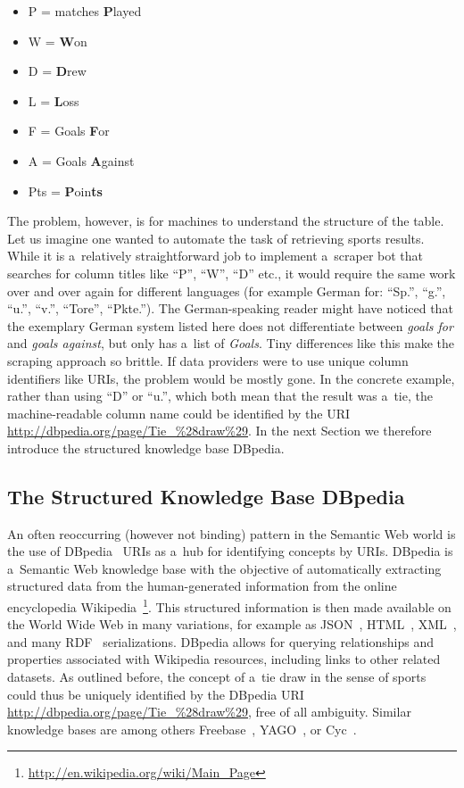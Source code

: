 \begin{itemize}
\item P = matches \textbf{P}layed
\item W = \textbf{W}on 
\item D = \textbf{D}rew
\item L = \textbf{L}oss
\item F = Goals \textbf{F}or
\item A = Goals \textbf{A}gainst
\item Pts = \textbf{P}oin\textbf{ts}
\end{itemize}

The problem, however, is for machines to understand the structure of the table.
Let us imagine one wanted to automate the task of retrieving sports results.
While it is a~relatively straightforward job to implement a~scraper bot that
searches for column titles like ``P'', ``W'', ``D'' etc.,
it would require the same work over and over again for different languages
(for example German for: ``Sp.'', ``g.'', ``u.'', ``v.'', ``Tore'', ``Pkte.'').
The German-speaking reader might have noticed that the exemplary German system listed here
does not differentiate between \emph{goals for} and \emph{goals against}, but only has a~list of \emph{Goals}.
Tiny differences like this make the scraping approach so brittle.
If data providers were to use unique column identifiers like URIs, the problem would be mostly gone.
In the concrete example, rather than using ``D'' or ``u.'', which both mean that the result was a~tie,
the machine-readable column name could be identified by the URI
\url{http://dbpedia.org/page/Tie_%28draw%29}.
In the next Section we therefore introduce the structured knowledge base DBpedia.

\subsection{The Structured Knowledge Base DBpedia}
An often reoccurring (however not binding) pattern in the Semantic Web world
is the use of DBpedia~\cite{Auer2007} URIs as a~hub for identifying concepts by URIs.
DBpedia is a~Semantic Web knowledge base with the objective of
automatically extracting structured data from the human-generated information from
the online encyclopedia Wikipedia~\footnote{\url{http://en.wikipedia.org/wiki/Main_Page}}.
This structured information is then made available on the World Wide Web in many variations,
for example as JSON~\cite{Crockford2006}, HTML~\cite{LeHors1999}, XML~\cite{Bray1998},
and many RDF~\cite{Klyne2004} serializations.
DBpedia allows for querying relationships and properties associated with Wikipedia resources,
including links to other related datasets.
As outlined before, the concept of a~tie draw in the sense of sports
could thus be uniquely identified by the DBpedia URI \url{http://dbpedia.org/page/Tie_%28draw%29},
free of all ambiguity.
Similar knowledge bases are among others Freebase~\cite{Markoff2007},
YAGO~\cite{Suchanek2007}, or Cyc~\cite{Wilkins1997}.

